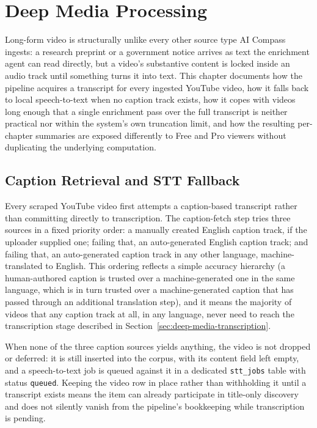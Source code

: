 \chapter{Deep Media Processing}
\label{chap:deep-media}

Long-form video is structurally unlike every other source type AI Compass ingests: a research preprint or a government notice arrives as text the enrichment agent can read directly, but a video's substantive content is locked inside an audio track until something turns it into text. This chapter documents how the pipeline acquires a transcript for every ingested YouTube video, how it falls back to local speech-to-text when no caption track exists, how it copes with videos long enough that a single enrichment pass over the full transcript is neither practical nor within the system's own truncation limit, and how the resulting per-chapter summaries are exposed differently to Free and Pro viewers without duplicating the underlying computation.

\section{Caption Retrieval and STT Fallback}
\label{sec:deep-media-captions}

Every scraped YouTube video first attempts a caption-based transcript rather than committing directly to transcription. The caption-fetch step tries three sources in a fixed priority order: a manually created English caption track, if the uploader supplied one; failing that, an auto-generated English caption track; and failing that, an auto-generated caption track in any other language, machine-translated to English. This ordering reflects a simple accuracy hierarchy (a human-authored caption is trusted over a machine-generated one in the same language, which is in turn trusted over a machine-generated caption that has passed through an additional translation step), and it means the majority of videos that any caption track at all, in any language, never need to reach the transcription stage described in Section~\ref{sec:deep-media-transcription}.

When none of the three caption sources yields anything, the video is not dropped or deferred: it is still inserted into the corpus, with its content field left empty, and a speech-to-text job is queued against it in a dedicated \texttt{stt\_jobs} table with status \texttt{queued}. Keeping the video row in place rather than withholding it until a transcript exists means the item can already participate in title-only discovery and does not silently vanish from the pipeline's bookkeeping while transcription is pending.

